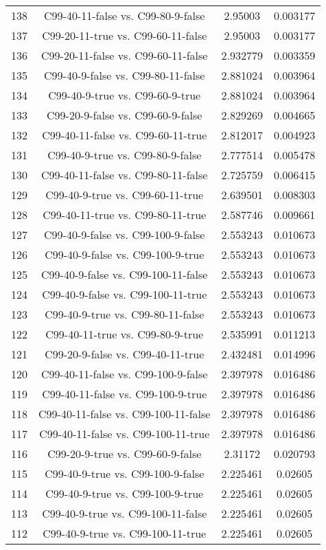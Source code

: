 \documentclass[a4paper,10pt]{article}
\begin{document}
\begin{landscape}
\begin{table}[!htp]
\begin{tabular}{cccc}
138&C99-40-11-false vs. C99-80-9-false&2.95003&0.003177\\
137&C99-20-11-true vs. C99-60-11-false&2.95003&0.003177\\
136&C99-20-11-false vs. C99-60-11-false&2.932779&0.003359\\
135&C99-40-9-false vs. C99-80-11-false&2.881024&0.003964\\
134&C99-40-9-true vs. C99-60-9-true&2.881024&0.003964\\
133&C99-20-9-false vs. C99-60-9-false&2.829269&0.004665\\
132&C99-40-11-false vs. C99-60-11-true&2.812017&0.004923\\
131&C99-40-9-true vs. C99-80-9-false&2.777514&0.005478\\
130&C99-40-11-false vs. C99-80-11-false&2.725759&0.006415\\
129&C99-40-9-true vs. C99-60-11-true&2.639501&0.008303\\
128&C99-40-11-true vs. C99-80-11-true&2.587746&0.009661\\
127&C99-40-9-false vs. C99-100-9-false&2.553243&0.010673\\
126&C99-40-9-false vs. C99-100-9-true&2.553243&0.010673\\
125&C99-40-9-false vs. C99-100-11-false&2.553243&0.010673\\
124&C99-40-9-false vs. C99-100-11-true&2.553243&0.010673\\
123&C99-40-9-true vs. C99-80-11-false&2.553243&0.010673\\
122&C99-40-11-true vs. C99-80-9-true&2.535991&0.011213\\
121&C99-20-9-false vs. C99-40-11-true&2.432481&0.014996\\
120&C99-40-11-false vs. C99-100-9-false&2.397978&0.016486\\
119&C99-40-11-false vs. C99-100-9-true&2.397978&0.016486\\
118&C99-40-11-false vs. C99-100-11-false&2.397978&0.016486\\
117&C99-40-11-false vs. C99-100-11-true&2.397978&0.016486\\
116&C99-20-9-true vs. C99-60-9-false&2.31172&0.020793\\
115&C99-40-9-true vs. C99-100-9-false&2.225461&0.02605\\
114&C99-40-9-true vs. C99-100-9-true&2.225461&0.02605\\
113&C99-40-9-true vs. C99-100-11-false&2.225461&0.02605\\
112&C99-40-9-true vs. C99-100-11-true&2.225461&0.02605\\

\end{tabular}
\end{table}
\end{landscape}
\end{document}
